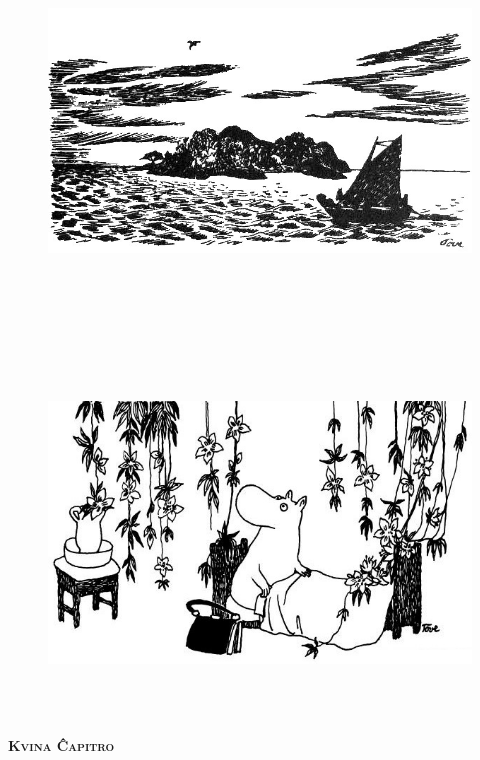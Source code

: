 \begin{figure}[htbp]
\centering
\includegraphics[width=450pt,height=259pt]{_22.jpg}
\caption{}
\label{_22}
\end{figure}

\chapter[Kvina Ĉapitro]{}


\begin{figure}[htbp]
\centering
\includegraphics[width=450pt,height=278pt]{_26.jpg}
\caption{}
\label{_26}
\end{figure}

\begin{center}\textbf{\Large\color{ForestGreen}\textsc{Kvina Ĉapitro}}\end{center}

